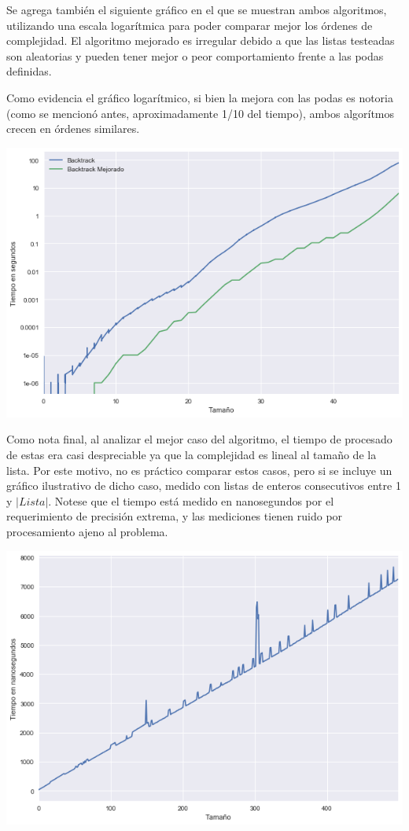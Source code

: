 	Se agrega también el siguiente gráfico en el que se muestran ambos algoritmos, utilizando una escala logarítmica para poder comparar mejor los órdenes de complejidad. El algoritmo mejorado es irregular debido a que las listas testeadas son aleatorias y pueden tener mejor o peor comportamiento frente a las podas definidas.

	Como evidencia el gráfico logarítmico, si bien la mejora con las podas es notoria (como se mencionó antes, aproximadamente 1/10 del tiempo), ambos algorítmos crecen en órdenes similares.

	\begin{center}
	\includegraphics[width=.8\textwidth]{ej2-2.png}
	\end{center}

	Como nota final, al analizar el mejor caso del algoritmo, el tiempo de procesado de estas era casi despreciable ya que la complejidad es lineal al tamaño de la lista. Por este motivo, no es práctico comparar estos casos, pero si se incluye un gráfico ilustrativo de dicho caso, medido con listas de enteros consecutivos entre 1 y $|Lista|$. Notese que el tiempo está medido en nanosegundos por el requerimiento de precisión extrema, y las mediciones tienen ruido por procesamiento ajeno al problema.

	\begin{center}
	\includegraphics[width=.8\textwidth]{ej2-3.png}
	\end{center}